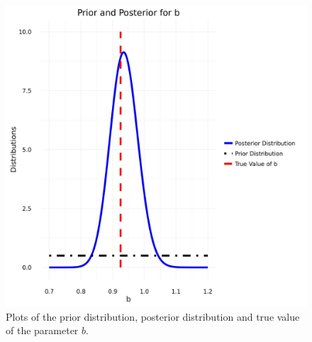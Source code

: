 \documentclass{sfuthesis}
\newcommand{\post}{\mathbb{P}_{post}}
\newcommand{\like}{\mathbb{P}_{like}}
\begin{document}
%
%
%
\begin{figure}[H]
\centering
\includegraphics[scale=0.6]{./FigChap3/prior_posterior.jpg}
\caption{Plots of the prior distribution, posterior distribution and true value of the parameter $b$.}
\label{figlikeprior}
\end{figure} 
\end{document}
